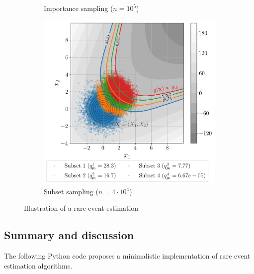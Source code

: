 \begin{figure}[ht]
\begin{subfigure}[b]{0.32\textwidth}
        \caption{Importance sampling ($n=10^5$)}
    \end{subfigure}
    \hfill
    \begin{subfigure}[b]{0.32\textwidth}
        \centering
        \includegraphics[width=\textwidth]{../numerical_experiments/chapter1/figures/reliability_SS_illustration.png}
        \caption{Subset sampling ($n=4\cdot10^4$)}
    \end{subfigure}
       \caption{Illustration of a rare event estimation}
       \label{fig:simulation_reliability}
\end{figure}



\subsection{Summary and discussion}



\begin{otexample}
    The following Python code proposes a minimalistic \ot implementation of rare event estimation algorithms. 
\end{otexample}




